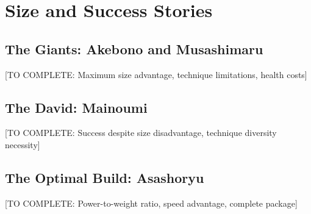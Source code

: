\section{Size and Success Stories}

\subsection{The Giants: Akebono and Musashimaru}

[TO COMPLETE: Maximum size advantage, technique limitations, health costs]

\subsection{The David: Mainoumi}

[TO COMPLETE: Success despite size disadvantage, technique diversity necessity]

\subsection{The Optimal Build: Asashoryu}

[TO COMPLETE: Power-to-weight ratio, speed advantage, complete package]
